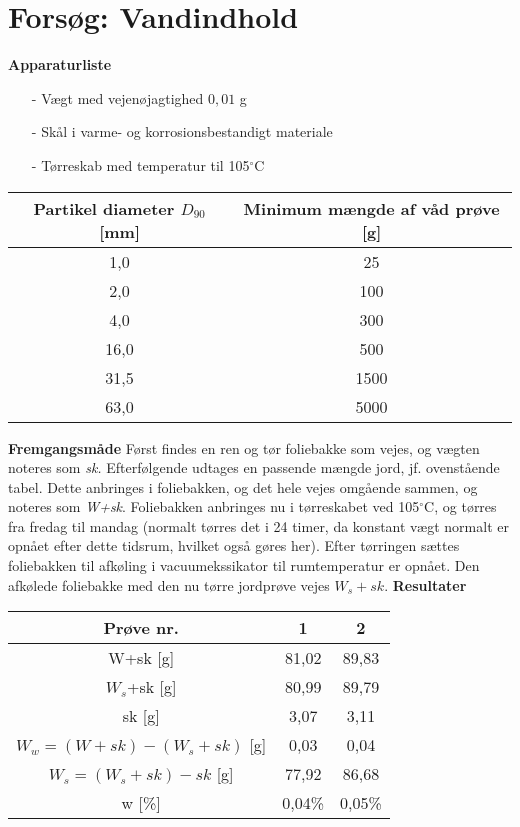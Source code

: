 \chapter{Forsøg: Vandindhold}

\textbf{Apparaturliste}
\begin{itemize}
\item[-] Vægt med vejenøjagtighed $0,\!01$ g
\item[-] Skål i varme- og korrosionsbestandigt materiale
\item[-] Tørreskab med temperatur til 105$^{\circ}$C
\end{itemize}

\begin{center}
	\begin{tabular}{ |c|c| } 
		\hline
		Partikel diameter $D_{90}$ [mm] & Minimum mængde af våd prøve [g] \\	\hline
		1,0 & 25 \\		\hline
		2,0 & 100 \\	\hline 
		4,0 & 300 \\ 	\hline
		16,0 & 500 \\	\hline
		31,5 & 1500 \\	\hline
		63,0 & 5000 \\	\hline	
	\end{tabular}
\end{center}

\textbf{Fremgangsmåde}
\newline
Først findes en ren og tør foliebakke som vejes, og vægten noteres som \textit{sk.} Efterfølgende udtages en passende mængde jord, jf. ovenstående tabel. Dette anbringes i foliebakken, og det hele vejes omgående sammen, og noteres som \textit{W+sk}.
\newline \indent{     }  Foliebakken anbringes nu i tørreskabet ved 105$^{\circ}$C, og tørres fra fredag til mandag (normalt tørres det i 24 timer, da konstant vægt normalt er opnået efter dette tidsrum, hvilket også gøres her). Efter tørringen sættes foliebakken til afkøling i vacuumekssikator til rumtemperatur er opnået. Den afkølede foliebakke med den nu tørre jordprøve vejes \textit{$W_{s}+sk$}.
\newline
\newline
\textbf{Resultater}
\begin{center}
	\begin{tabular}{ |c|c|c| } 
		\hline
		Prøve nr. & 1 & 2 \\	\hline
		W+sk [g] & 81,02 & 89,83 \\	\hline
		$W_s$+sk [g] & 80,99 & 89,79 \\	\hline 
		sk [g] & 3,07 & 3,11 \\ \hline
		$W_w=(W+sk) - (W_s+sk)$ [g] & 0,03 & 0,04 \\	\hline
		$W_s=(W_s+sk) - sk$ [g] & 77,92 & 86,68 \\	\hline		
		w [\%] & 0,04\% & 0,05\% \\	\hline	
	\end{tabular}
\end{center}

